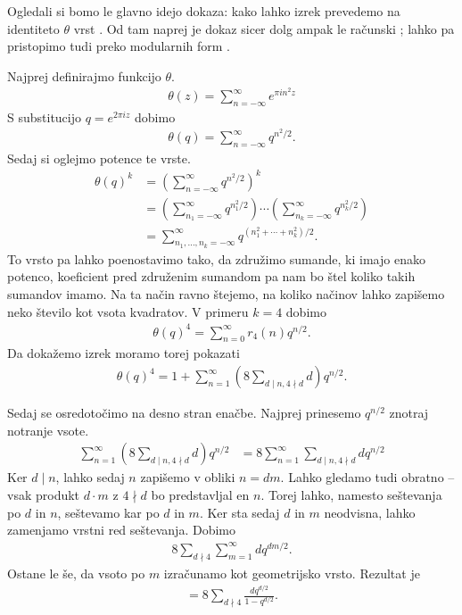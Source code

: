\begin{dokaz}
    Ogledali si bomo le glavno idejo dokaza: kako lahko izrek prevedemo na identiteto \(\theta\) vrst \cite{kato3}. Od tam naprej je dokaz sicer dolg ampak le računski \cite{Hirschhorn_1982}; lahko pa pristopimo tudi preko modularnih form \cite{kato3}.

    Najprej definirajmo funkcijo \(\theta\).
    \begin{align*}
        \theta(z) = \sum_{n=-\infty}^\infty e^{\pi i n^2 z}
    \end{align*}
    S substitucijo \(q = e^{2\pi i z}\) dobimo
    \begin{align*}
        \theta(q) = \sum_{n=-\infty}^\infty q^{n^2/2}.
    \end{align*}
    Sedaj si oglejmo potence te vrste.
    \begin{align*}
        \theta(q)^k & = \left(\sum_{n=-\infty}^\infty q^{n^2/2}\right)^k \\
                    & = \left(\sum_{n_1=-\infty}^\infty q^{n_1^2/2}\right) \cdots \left(\sum_{n_k=-\infty}^\infty q^{n_k^2/2}\right) \\
                    & = \sum_{n_1, \ldots, n_k = -\infty}^\infty q^{(n_1^2 + \cdots + n_k^2)/2}.
    \end{align*}
    To vrsto pa lahko poenostavimo tako, da združimo sumande, ki imajo enako potenco, koeficient pred združenim sumandom pa nam bo štel koliko takih sumandov imamo. Na ta način ravno štejemo, na koliko načinov lahko zapišemo neko število kot vsota kvadratov. V primeru \(k=4\) dobimo
    \begin{align*}
        \theta(q)^4 = \sum_{n=0}^\infty r_4(n) q^{n/2}.
    \end{align*}
    Da dokažemo izrek moramo torej pokazati
    \begin{align*}
        \theta(q)^4 = 1+\sum_{n=1}^\infty \left(8\sum_{d\mid n, 4\nmid d} d \right) q^{n/2}.
    \end{align*}

    Sedaj se osredotočimo na desno stran enačbe. Najprej prinesemo \(q^{n/2}\) znotraj notranje vsote.
    \begin{align*}
        \sum_{n=1}^\infty \left(8\sum_{d\mid n, 4\nmid d} d \right) q^{n/2} & =  8\sum_{n=1}^\infty \sum_{d\mid n, 4\nmid d} d  q^{n/2}
    \end{align*}
    Ker \(d \mid n\), lahko sedaj \(n\) zapišemo v obliki \(n = dm\). Lahko gledamo tudi obratno -- vsak produkt \(d\cdot m\) z \(4\nmid d\) bo predstavljal en \(n\). Torej lahko, namesto seštevanja po \(d\) in \(n\), seštevamo kar po \(d\) in \(m\). Ker sta sedaj \(d\) in \(m\) neodvisna, lahko zamenjamo vrstni red seštevanja. Dobimo
    \begin{align*}
        8\sum_{d\nmid 4} \sum_{m = 1}^\infty d  q^{dm/2}.
    \end{align*}
    Ostane le še, da vsoto po \(m\) izračunamo kot geometrijsko vrsto. Rezultat je
    \begin{align*}
        = 8\sum_{d\nmid 4} \frac{d q^{d/2}}{1-q^{d/2}}.
    \end{align*}


\end{dokaz}
